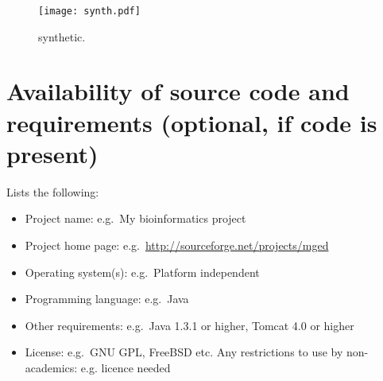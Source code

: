 \documentclass[a4paper,num-refs]{oup-contemporary}
\begin{document}
\begin{figure}[!h]
  \centering
  \texttt{[image: synth.pdf]}
  \caption{synthetic.}
  \label{fig.synth}
\end{figure}








\section{Availability of source code and requirements (optional, if code is present)}

Lists the following:
\begin{itemize}
\item Project name: e.g.~My bioinformatics project
\item Project home page: e.g.~\url{http://sourceforge.net/projects/mged}
\item Operating system(s): e.g.~Platform independent
\item Programming language: e.g.~Java
\item Other requirements: e.g.~Java 1.3.1 or higher, Tomcat 4.0 or higher
\item License: e.g.~GNU GPL, FreeBSD etc.
Any restrictions to use by non-academics: e.g. licence needed
\end{itemize}
\end{document}
